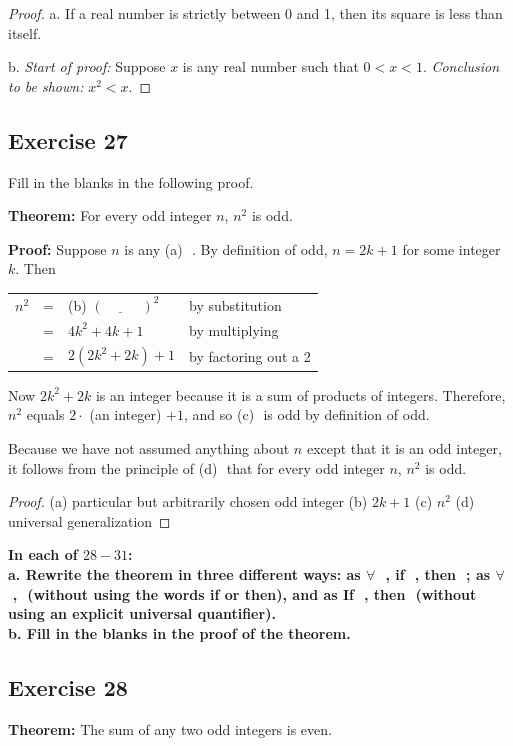 \documentclass[14pt]{extarticle}
\newcommand{\fbl}{\underline{\hspace{1cm}}\,\,}
\newcommand{\fa}{\forall}
\newcommand{\cy}{\color{cyan}}
\begin{document}
\begin{proof}
a. If a real number is strictly between 0 and 1, then its square is less than itself.

b. {\it Start of proof:} Suppose $x$ is any real number such that $0 < x < 1$. {\it Conclusion to be shown:} $x^2 < x$.
\end{proof}

\subsection{Exercise 27}
Fill in the blanks in the following proof.

{\bf Theorem:} For every odd integer $n$, $n^2$ is odd.

{\bf Proof:} Suppose $n$ is any {\cy (a)} \fbl. By definition of odd, $n = 2k + 1$ for some integer $k$. Then

\begin{center}
\begin{tabular}{rcll}
$n^2$ & = & {\cy (b)} $(\fbl)^2$ & \cy by substitution \\
& = & $4k^2 + 4k + 1$ & \cy by multiplying \\
& = & $2(2k^2 + 2k) + 1$ & \cy by factoring out a 2 \\
\end{tabular}
\end{center}

Now $2k^2 + 2k$ is an integer because it is a sum of products of integers. Therefore, $n^2$ equals $2\cdot$ (an integer) $+ 1$, and so {\cy (c)} \fbl is odd by definition of odd.

Because we have not assumed anything about $n$ except that it is an odd integer, it follows from the principle of {\cy (d)} \fbl that for every odd integer $n$, $n^2$ is odd.

\begin{proof}
(a) particular but arbitrarily chosen odd integer 
(b) $2k + 1$ (c) $n^2$ (d) universal generalization
\end{proof}

{\bf \cy In each of $28-31$: \\ 
a. Rewrite the theorem in three different ways: as $\fa$ \fbl, if \fbl, then \fbl; as $\fa$ \fbl, \fbl (without using the words if or then), and as If \fbl, then \fbl (without using an explicit universal quantifier). \\
b. Fill in the blanks in the proof of the theorem.}

\subsection{Exercise 28}
{\bf Theorem:} The sum of any two odd integers is even.
\end{document}
